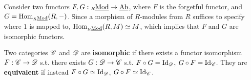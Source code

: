 \documentclass{article}
\begin{document}
\begin{example} 
    Consider two functors $F, G: {}_{R}\underline{\textup{Mod}} \to \underline{\textup{Ab}}$, where $F$ is the forgetful functor, and $G = \mathrm{Hom}_{{}_{R}\underline{\textup{Mod}}}(R, -)$. Since a morphism of $R$-modules from $R$ suffices to specify where $1$ is mapped to, $\mathrm{Hom}_{{}_{R}\underline{\textup{Mod}}}(R, M) \simeq M$, which implies that $F$ and $G$ are isomorphic functors.
\end{example}

\begin{definition}
    Two categories $\mathscr{C}$ and $\mathscr{D}$ are \textbf{isomorphic} if there exists a functor isomorphism $F: \mathscr{C} \to \mathscr{D}$ s.t. there exists $G: \mathscr{D} \to \mathscr{C}$ s.t. $F \circ G = \mathrm{Id}_{\mathscr{D}}$, $G \circ F = \mathrm{Id}_{\mathscr{C}}$. They are \textbf{equivalent} if instead $F \circ G \simeq \mathrm{Id}_{\mathscr{D}}$, $G \circ F \simeq \mathrm{Id}_{\mathscr{C}}$.
\end{definition}
      
\end{document}
